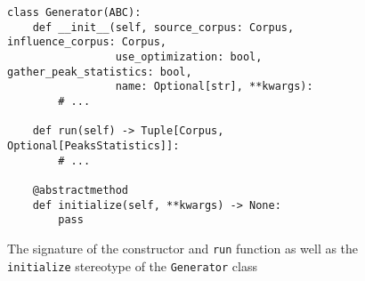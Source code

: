\begin{figure}
	\begin{lstlisting}
class Generator(ABC):
    def __init__(self, source_corpus: Corpus, influence_corpus: Corpus, 
                 use_optimization: bool, gather_peak_statistics: bool, 
                 name: Optional[str], **kwargs):
        # ...

    def run(self) -> Tuple[Corpus, Optional[PeaksStatistics]]:
        # ...
        
    @abstractmethod
    def initialize(self, **kwargs) -> None:
        pass
	\end{lstlisting}
	\caption{The signature of the constructor and \texttt{run} function as well as the \texttt{initialize} stereotype of the \texttt{Generator} class}
	\label{fig:4-generator-generator}
\end{figure}